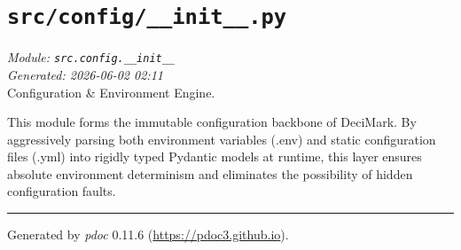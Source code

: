 
\section{\texttt{src/config/\_\_init\_\_.py}}
\textit{Module: \texttt{src.config.\_\_init\_\_}} \\
\textit{Generated: 2026-06-02 02:11} \\

Configuration \& Environment Engine.

This module forms the immutable configuration backbone of DeciMark. By
aggressively parsing both environment variables (.env) and static
configuration files (.yml) into rigidly typed Pydantic models at
runtime, this layer ensures absolute environment determinism and
eliminates the possibility of hidden configuration faults.

\begin{center}\rule{0.5\linewidth}{0.5pt}
\end{center}

Generated by \emph{pdoc} 0.11.6 (\url{https://pdoc3.github.io}).
